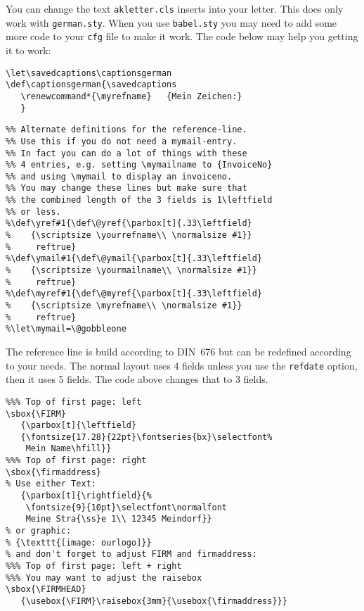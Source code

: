 \documentclass[a4paper]{article}
\begin{document}
You can change the text \texttt{akletter.cls} inserts into your letter. 
This does only work with \texttt{german.sty}. When you use \texttt{babel.sty} 
you may need to add some more code to your \texttt{cfg} file to make 
it work. The code below may help you getting it to work:

\begin{verbatim}
\let\savedcaptions\captionsgerman
\def\captionsgerman{\savedcaptions
   \renewcommand*{\myrefname}	{Mein Zeichen:}
   }
\end{verbatim}


\begin{verbatim}
%% Alternate definitions for the reference-line.
%% Use this if you do not need a mymail-entry.
%% In fact you can do a lot of things with these
%% 4 entries, e.g. setting \mymailname to {InvoiceNo}
%% and using \mymail to display an invoiceno.
%% You may change these lines but make sure that
%% the combined length of the 3 fields is 1\leftfield
%% or less.
%\def\yref#1{\def\@yref{\parbox[t]{.33\leftfield}
%    {\scriptsize \yourrefname\\ \normalsize #1}}
%     reftrue}
%\def\ymail#1{\def\@ymail{\parbox[t]{.33\leftfield}
%    {\scriptsize \yourmailname\\ \normalsize #1}}
%     reftrue}
%\def\myref#1{\def\@myref{\parbox[t]{.33\leftfield}
%    {\scriptsize \myrefname\\ \normalsize #1}}
%     reftrue}
%\let\mymail=\@gobbleone
\end{verbatim}

The reference line is build according to DIN~676 but can be redefined 
according to your needs. The normal layout uses 4 fields unless you 
use the \verb+refdate+ option, then it uses 5 fields. The code above 
changes that to 3 fields.


\begin{verbatim}
%%% Top of first page: left
\sbox{\FIRM}
   {\parbox[t]{\leftfield}
   {\fontsize{17.28}{22pt}\fontseries{bx}\selectfont%
    Mein Name\hfill}}
%%% Top of first page: right
\sbox{\firmaddress}
% Use either Text:
   {\parbox[t]{\rightfield}{%
    \fontsize{9}{10pt}\selectfont\normalfont
    Meine Stra{\ss}e 1\\ 12345 Meindorf}}
% or graphic:
% {\texttt{[image: ourlogo]}}
% and don't forget to adjust FIRM and firmaddress:
%%% Top of first page: left + right
%%% You may want to adjust the raisebox
\sbox{\FIRMHEAD}
   {\usebox{\FIRM}\raisebox{3mm}{\usebox{\firmaddress}}}
\end{verbatim}
\end{document}
